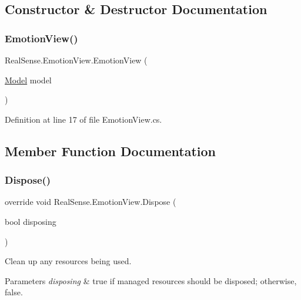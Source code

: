 \subsection{Constructor \& Destructor Documentation}
\mbox{\label{class_real_sense_1_1_emotion_view_a6f0e3d2564b7ecfea7c153faf76b53a6}} 
\subsubsection{\texorpdfstring{Emotion\+View()}{EmotionView()}}
{\footnotesize\ttfamily Real\+Sense.\+Emotion\+View.\+Emotion\+View (\begin{DoxyParamCaption}\item[{\hyperlink{class_real_sense_1_1_model}{Model}}]{model }\end{DoxyParamCaption})}



Definition at line 17 of file Emotion\+View.\+cs.



\subsection{Member Function Documentation}
\mbox{\label{class_real_sense_1_1_emotion_view_a544db73a74ee3f66ec3c810121e45bc4}} 
\subsubsection{\texorpdfstring{Dispose()}{Dispose()}}
{\footnotesize\ttfamily override void Real\+Sense.\+Emotion\+View.\+Dispose (\begin{DoxyParamCaption}\item[{bool}]{disposing }\end{DoxyParamCaption})\hspace{0.3cm}{\ttfamily [protected]}}



Clean up any resources being used. 


\begin{DoxyParams}{Parameters}
{\em disposing} & true if managed resources should be disposed; otherwise, false.\\
\hline
\end{DoxyParams}


